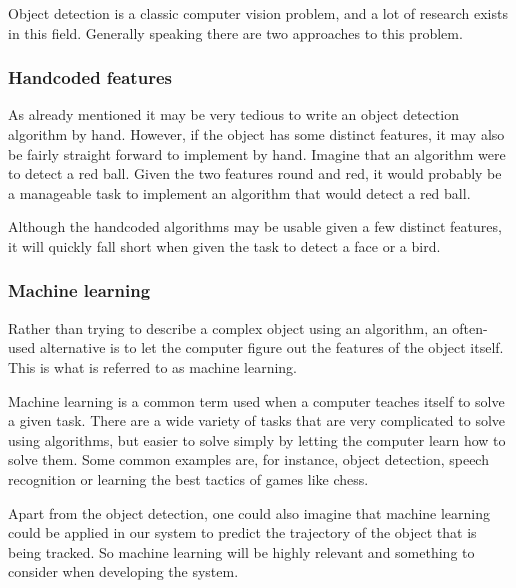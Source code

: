Object detection is a classic computer vision problem, and a lot of research exists in this field.
Generally speaking there are two approaches to this problem.

\subsubsection{Handcoded features}
As already mentioned it may be very tedious to write an object detection algorithm by hand.
However, if the object has some distinct features, it may also be fairly straight forward to implement by hand.
Imagine that an algorithm were to detect a red ball. 
Given the two features round and red, it would probably be a manageable task to implement an algorithm that would detect a red ball.

Although the handcoded algorithms may be usable given a few distinct features, it will quickly fall short when given the task to detect a face or a bird.

\subsubsection{Machine learning}
Rather than trying to describe a complex object using an algorithm, an often-used alternative is to let the computer figure out the features of the object itself.
This is what is referred to as machine learning.

Machine learning is a common term used when a computer teaches itself to solve a given task\cite{MachineLearningWiki}.
There are a wide variety of tasks that are very complicated to solve using algorithms, but easier to solve simply by letting the computer learn how to solve them. 
Some common examples are, for instance, object detection, speech recognition or learning the best tactics of games like chess.

Apart from the object detection, one could also imagine that machine learning could be applied in our system to predict the trajectory of the object that is being tracked.
So machine learning will be highly relevant and something to consider when developing the system.
